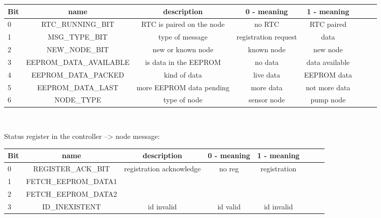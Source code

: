 \documentclass[12pt,a4paper,titlepage,oneside]{article}
\begin{document}
\begin{table}[htbp]
        \small
        \setlength\tabcolsep{2pt}
\begin{tabular}{ l c c c c c c r }
  Bit & name & description & 0 - meaning & 1 - meaning\\ \hline
  0 & RTC\_RUNNING\_BIT & RTC is paired on the node & no RTC & RTC paired \\ \hline
  1 & MSG\_TYPE\_BIT & type of message & registration request & data \\ \hline
  2 & NEW\_NODE\_BIT & new or known node & known node & new node \\ \hline
  3 & EEPROM\_DATA\_AVAILABLE & is data in the EEPROM & no data & data available\\ \hline
  4 & EEPROM\_DATA\_PACKED & kind of data & live data & EEPROM data\\ \hline
  5 & EEPROM\_DATA\_LAST & more EEPROM data pending & more data & not more data \\ \hline
  6 & NODE\_TYPE & type of node & sensor node & pump node\\ \hline
\end{tabular}\\
\end{table}


Status register in the controller --> node message:


\begin{table}[htbp]
        \small
        \setlength\tabcolsep{2pt}
\begin{tabular}{ l c c c c c c r }
  Bit & name & description & 0 - meaning & 1 - meaning\\ \hline
  0 & REGISTER\_ACK\_BIT & registration acknowledge & no reg & registration\\ \hline
  1 & FETCH\_EEPROM\_DATA1 & &  &  \\ \hline
  2 & FETCH\_EEPROM\_DATA2 &  & &  \\ \hline
  3 & ID\_INEXISTENT & id invalid & id valid & id invalid\\ \hline
\end{tabular}\\
\end{table}
\end{document}
